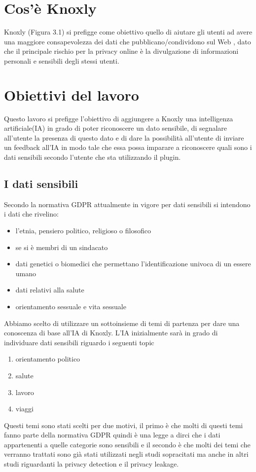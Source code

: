 \section{Cos'è Knoxly}
Knoxly (Figura 3.1) si prefigge come obiettivo quello di aiutare gli utenti ad avere una maggiore consapevolezza
dei dati che pubblicano/condividono sul Web , dato che il principale rischio per la privacy online è la divulgazione di
informazioni personali e sensibili degli stessi utenti.\newline

\section{Obiettivi del lavoro}
Questo lavoro si prefigge l'obiettivo di aggiungere a Knoxly una intelligenza artificiale(IA) in grado di poter riconoscere un dato sensibile, di segnalare all'utente la presenza di questo dato e di dare la possibilità all'utente di inviare un feedback all'IA in modo tale che essa possa imparare a riconoscere quali sono i dati sensibili secondo l'utente che sta utilizzando il plugin.
\subsection{I dati sensibili}
Secondo la normativa GDPR attualmente in vigore per dati sensibili si intendono i dati che rivelino:
\begin{itemize}
    \item l'etnia, pensiero politico, religioso o filosofico
    \item se si è membri di un sindacato
    \item dati genetici o biomedici che permettano l'identificazione univoca di un essere umano
    \item dati relativi alla salute
    \item orientamento sessuale e vita sessuale
\end{itemize}
Abbiamo scelto di utilizzare un sottoinsieme di temi di partenza per dare una conoscenza di base all'IA di Knoxly. L'IA inizialmente sarà in grado di individuare dati sensibili riguardo i seguenti topic
\begin{enumerate}
    \item orientamento politico
    \item salute
    \item lavoro
    \item viaggi
\end{enumerate}
Questi temi sono stati scelti per due motivi, il primo è che molti di questi temi fanno parte della normativa GDPR quindi è una legge a dirci che i dati appartenenti a quelle categorie sono sensibili e il secondo è che molti dei temi che verranno trattati sono già stati utilizzati negli studi sopracitati ma anche in altri studi riguardanti la privacy detection e il privacy leakage.